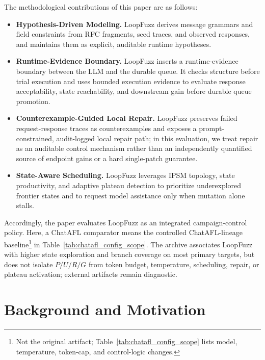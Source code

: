 \documentclass[final,5p,times,number]{elsarticle}
\begin{document}
The methodological contributions of this paper are as follows:
\begin{itemize}
    \item \textbf{Hypothesis-Driven Modeling.} LoopFuzz derives message grammars and field constraints from RFC fragments, seed traces, and observed responses, and maintains them as explicit, auditable runtime hypotheses.
    \item \textbf{Runtime-Evidence Boundary.} LoopFuzz inserts a runtime-evidence boundary between the LLM and the durable queue. It checks structure before trial execution and uses bounded execution evidence to evaluate response acceptability, state reachability, and downstream gain before durable queue promotion.
    \item \textbf{Counterexample-Guided Local Repair.} LoopFuzz preserves failed request-response traces as counterexamples and exposes a prompt-constrained, audit-logged local repair path; in this evaluation, we treat repair as an auditable control mechanism rather than an independently quantified source of endpoint gains or a hard single-patch guarantee.
    \item \textbf{State-Aware Scheduling.} LoopFuzz leverages IPSM topology, state productivity, and adaptive plateau detection to prioritize underexplored frontier states and to request model assistance only when mutation alone stalls.
\end{itemize}

Accordingly, the paper evaluates LoopFuzz as an integrated campaign-control policy. Here, a ChatAFL comparator means the controlled ChatAFL-lineage baseline\footnote{Not the original artifact; Table~\ref{tab:chatafl_config_scope} lists model, temperature, token-cap, and control-logic changes.} in Table~\ref{tab:chatafl_config_scope}. The archive associates LoopFuzz with higher state exploration and branch coverage on most primary targets, but does not isolate $P/U/R/G$ from token budget, temperature, scheduling, repair, or plateau activation; external artifacts remain diagnostic.

\section{Background and Motivation}
\end{document}

